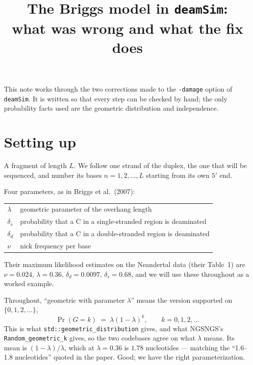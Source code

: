 \documentclass[11pt,a4paper]{article}
\title{The Briggs model in \texttt{deamSim}:\\ what was wrong and what the fix does}
\author{}
\date{}
\begin{document}
\maketitle

\noindent
This note works through the two corrections made to the \texttt{-damage} option of
\texttt{deamSim}. It is written so that every step can be checked by hand; the only
probability facts used are the geometric distribution and independence.

\section{Setting up}

A fragment of length $L$. We follow one strand of the duplex, the one that will be
sequenced, and number its bases $n = 1, 2, \dots, L$ starting from its own $5'$ end.

Four parameters, as in Briggs et al.\ (2007):
\begin{center}
\begin{tabular}{ll}
\toprule
$\lambda$   & geometric parameter of the overhang length \\
$\delta_s$  & probability that a C in a single-stranded region is deaminated \\
$\delta_d$  & probability that a C in a double-stranded region is deaminated \\
$\nu$       & nick frequency per base \\
\bottomrule
\end{tabular}
\end{center}

\noindent
Their maximum likelihood estimates on the Neandertal data (their Table~1) are
$\nu = 0.024$, $\lambda = 0.36$, $\delta_d = 0.0097$, $\delta_s = 0.68$, and we will
use these throughout as a worked example.

Throughout, ``geometric with parameter $\lambda$'' means the version supported on
$\{0, 1, 2, \dots\}$,
\begin{equation}
\Pr(G = k) \;=\; \lambda (1-\lambda)^k , \qquad k = 0, 1, 2, \dots
\label{eq:geom}
\end{equation}
This is what \texttt{std::geometric\_distribution} gives, and what NGSNGS's
\texttt{Random\_geometric\_k} gives, so the two codebases agree on what $\lambda$
means. Its mean is $(1-\lambda)/\lambda$, which at $\lambda = 0.36$ is $1.78$
nucleotides --- matching the ``1.6--1.8 nucleotides'' quoted in the paper. Good; we
have the right parameterization.
\end{document}
